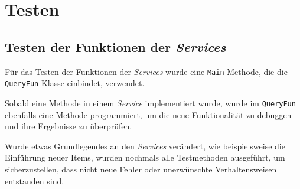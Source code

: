 \section{Testen}
	\subsection{Testen der Funktionen der \textit{Services}}
	Für das Testen der Funktionen der \textit{Services} wurde eine \texttt{Main}-Methode, die die \texttt{QueryFun}-Klasse einbindet, verwendet.
	
	Sobald eine Methode in einem \textit{Service} implementiert wurde, wurde im \texttt{QueryFun} ebenfalls eine Methode programmiert, um die neue Funktionalität zu debuggen und ihre Ergebnisse zu überprüfen.
	
	Wurde etwas Grundlegendes an den \textit{Services} verändert, wie beispielsweise die Einführung neuer Items, wurden nochmals alle Testmethoden ausgeführt, um sicherzustellen, dass nicht neue Fehler oder unerwünschte Verhaltensweisen entstanden sind.